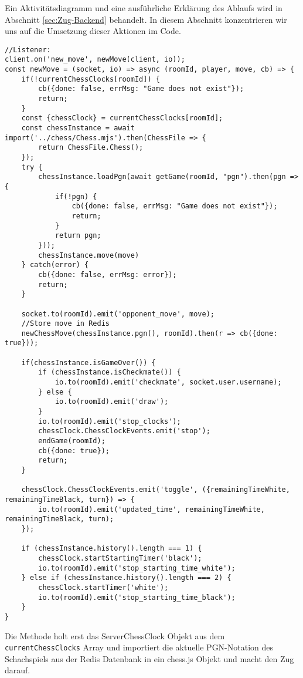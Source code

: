 Ein Aktivitätsdiagramm und eine ausführliche Erklärung des Ablaufs wird in Abschnitt \ref{sec:Zug-Backend} behandelt. In diesem Abschnitt konzentrieren wir uns auf die Umsetzung dieser Aktionen im Code.
\begin{lstlisting}[style=codeStyle, caption={newMove Methode die beim Eingang eines neuen Zugs aufgerufen wird}, label={lst:newMove}]
//Listener:
client.on('new_move', newMove(client, io));
const newMove = (socket, io) => async (roomId, player, move, cb) => {
    if(!currentChessClocks[roomId]) {
        cb({done: false, errMsg: "Game does not exist"});
        return;
    }
    const {chessClock} = currentChessClocks[roomId];
    const chessInstance = await import('../chess/Chess.mjs').then(ChessFile => {
        return ChessFile.Chess();
    });
    try {
        chessInstance.loadPgn(await getGame(roomId, "pgn").then(pgn => {
            if(!pgn) {
                cb({done: false, errMsg: "Game does not exist"});
                return;
            }
            return pgn;
        }));
        chessInstance.move(move)
    } catch(error) {
        cb({done: false, errMsg: error});
        return;
    }
	
    socket.to(roomId).emit('opponent_move', move);
    //Store move in Redis
    newChessMove(chessInstance.pgn(), roomId).then(r => cb({done: true}));
    
    if(chessInstance.isGameOver()) {
        if (chessInstance.isCheckmate()) {
            io.to(roomId).emit('checkmate', socket.user.username);
        } else {
            io.to(roomId).emit('draw');
        }
        io.to(roomId).emit('stop_clocks');
        chessClock.ChessClockEvents.emit('stop');
        endGame(roomId);
        cb({done: true});
        return;
    }
    
    chessClock.ChessClockEvents.emit('toggle', ({remainingTimeWhite, remainingTimeBlack, turn}) => {
        io.to(roomId).emit('updated_time', remainingTimeWhite, remainingTimeBlack, turn);
    });

    if (chessInstance.history().length === 1) {
        chessClock.startStartingTimer('black');
        io.to(roomId).emit('stop_starting_time_white');
    } else if (chessInstance.history().length === 2) {
        chessClock.startTimer('white');
        io.to(roomId).emit('stop_starting_time_black');
    }
}
\end{lstlisting}

Die Methode holt erst das ServerChessClock Objekt aus dem \verb|currentChessClocks| Array und importiert die aktuelle PGN-Notation des Schachspiels aus der Redis Datenbank in ein chess.js Objekt und macht den Zug darauf.


